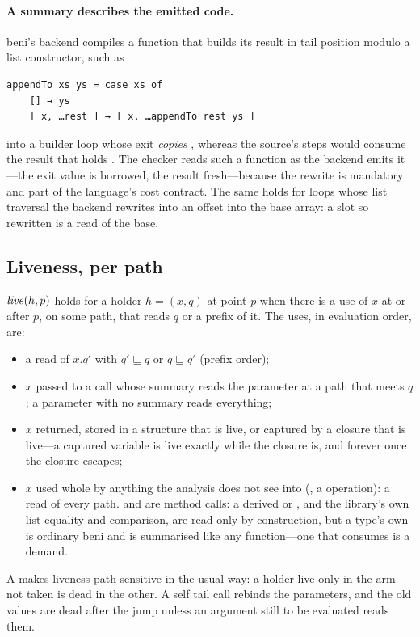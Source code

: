 \paragraph{A summary describes the emitted code.} beni's backend compiles a function that builds
its result in tail position modulo a list constructor, such as
\begin{Verbatim}
appendTo xs ys = case xs of
    [] → ys
    [ x, …rest ] → [ x, …appendTo rest ys ]
\end{Verbatim}
into a builder loop whose exit \emph{copies} , whereas the source's  steps would
consume the result that holds . The checker reads such a function as the backend emits
it---the exit value is borrowed, the result fresh---because the rewrite is mandatory and part of the
language's cost contract. The same holds for loops whose list traversal the backend rewrites into
an offset into the base array: a slot so rewritten is a read of the base.

\subsection{Liveness, per path}
\label{sec:model-liveness}

$\mathit{live}(h, p)$ holds for a holder $h = (x, q)$ at point $p$ when there is a use of $x$ at or after $p$,
on some path, that reads $q$ or a prefix of it. The uses, in evaluation order, are:
\begin{itemize}
\item a read of $x.q'$ with $q' \sqsubseteq q$ or $q \sqsubseteq q'$ (prefix order);
\item $x$ passed to a call whose summary reads the parameter at a path that meets $q$; a parameter
with no summary reads everything;
\item $x$ returned, stored in a structure that is live, or captured by a closure that is live---a
captured variable is live exactly while the closure is, and forever once the closure escapes;
\item $x$ used whole by anything the analysis does not see into (, a 
operation): a read of every path. \code{==} and \code{<} are method calls: a derived  or
, and the library's own list equality and comparison, are read-only by construction,
but a type's own  is ordinary beni and is summarised like any function---one that consumes
is a demand.
\end{itemize}
A  makes liveness path-sensitive in the usual way: a holder live only in the arm not
taken is dead in the other. A self tail call rebinds the parameters, and the old values are dead
after the jump unless an argument still to be evaluated reads them.


